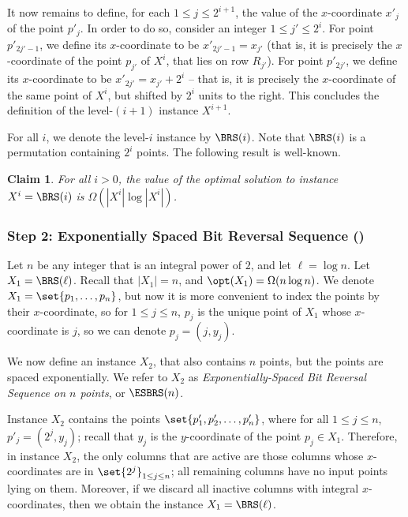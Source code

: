 \documentclass[11pt]{article}
\numberwithin{equation}{section}
\newtheorem{claim}[theorem]{Claim}
\theoremstyle{definition}
\theoremstyle{plain}
\begin{document}
It now remains to define, for each $1\leq j\leq 2^{i+1}$, the value of the $x$-coordinate $x'_j$ of the point $p'_j$. In order to do so, consider an integer $1\leq j'\leq 2^{i}$. For point $p'_{2j'-1}$, we define its $x$-coordinate to be $x'_{2j'-1}=x_{j'}$ (that is, it is precisely the $x$-coordinate of the point $p_{j'}$ of $X^i$, that lies on row $R_{j'}$). For point $p'_{2j'}$, we define its $x$-coordinate to be $x'_{2j'}=x_{j'}+2^i$ -- that is, it is precisely the $x$-coordinate of the same point of $X^i$, but shifted by $2^i$ units to the right.
This concludes the definition of the level-$(i+1)$ instance $X^{i+1}$. 

For all $i$, we denote the level-$i$ instance by $\BRS(i)$. Note that $\BRS(i)$ is a permutation containing $2^i$ points.
The following result is well-known.   
 

\begin{claim}\label{claim: large opt for BRS}
	For all $i>0$, the value of the optimal solution to instance $X^i=\BRS(i)$ is $\Omega(|X^i|\log |X^i|)$.
\end{claim}


%
%
%
\subsubsection{Step 2: Exponentially Spaced Bit Reversal Sequence (\ESBRS)}
%
%
%


%

Let $n$ be any integer that is an integral power of $2$, and let $\ell=\log n$. Let $X_1=\BRS(\ell)$. Recall that $|X_1|=n$, and  $\opt(X_1)=\Omega(n\log n)$. We denote $X_1=\set{p_1,\ldots,p_n}$, but now it is more convenient to index the points by their $x$-coordinate, so for $1\leq j\leq n$, $p_j$ is the unique point of $X_1$ whose $x$-coordinate is $j$, so we can denote $p_j=(j,y_j)$.

We now define an instance $X_2$, that also contains $n$ points, but the points are spaced exponentially.
We refer to $X_2$ as \emph{Exponentially-Spaced Bit Reversal Sequence on $n$ points}, or $\ESBRS(n)$.

Instance $X_2$ contains the points $\set{p'_1,p'_2,\ldots,p'_n}$, where  for all $1\leq j\leq n$, $p'_j=(2^j,y_j)$; recall that $y_j$ is the $y$-coordinate of the point $p_j\in X_1$. Therefore, in instance $X_2$, the only columns that are active are those columns whose $x$-coordinates are in $\set{2^j}_{1\leq j\leq n}$; all remaining columns have no input points lying on them. Moreover, if we discard all inactive columns with integral $x$-coordinates, then we obtain the instance $X_1=\BRS(\ell)$.
\end{document}
